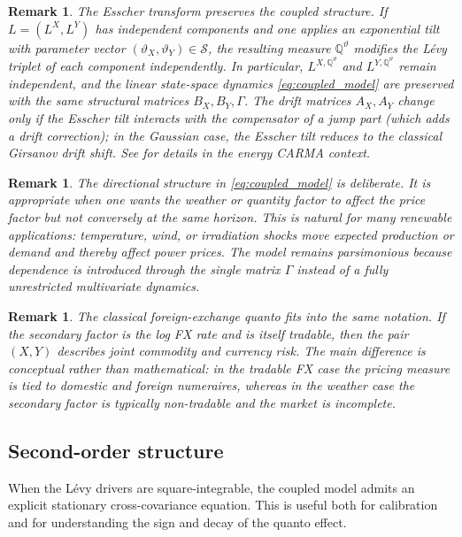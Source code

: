 \documentclass[10pt,a4paper,reqno]{amsart}
\newtheorem{remark}[theorem]{Remark}
\newcommand{\Q}{\mathbb{Q}}
\newcommand{\1}{\mathbbm{1}}
\begin{document}
\begin{remark}\label{rem:esscher_preservation}
The Esscher transform preserves the coupled structure. If \(L = (L^X, L^Y)\)
has independent components and one applies an exponential tilt with parameter
vector \((\vartheta_X, \vartheta_Y) \in \mathcal{S}\), the resulting measure
\(\Q^{\vartheta}\) modifies the Lévy triplet of each component independently.
In particular, \(L^{X,\Q^\vartheta}\) and \(L^{Y,\Q^\vartheta}\) remain
independent, and the linear state-space dynamics \eqref{eq:coupled_model} are
preserved with the same structural matrices \(B_X, B_Y, \Gamma\). The drift
matrices \(A_X, A_Y\) change only if the Esscher tilt interacts with the
compensator of a jump part (which adds a drift correction); in the Gaussian
case, the Esscher tilt reduces to the classical Girsanov drift shift. See
\citet{Ben14} for details in the energy CARMA context.
\end{remark}

\begin{remark}
The directional structure in \eqref{eq:coupled_model} is deliberate. It is
appropriate when one wants the weather or quantity factor to affect the price
factor but not conversely at the same horizon. This is natural for many
renewable applications: temperature, wind, or irradiation shocks move expected
production or demand and thereby affect power prices. The model remains
parsimonious because dependence is introduced through the single matrix
\(\Gamma\) instead of a fully unrestricted multivariate dynamics.
\end{remark}

\begin{remark}
The classical foreign-exchange quanto fits into the same notation. If the
secondary factor is the log FX rate and is itself tradable, then the pair
\((X,Y)\) describes joint commodity and currency risk. The main difference is
conceptual rather than mathematical: in the tradable FX case the pricing measure
is tied to domestic and foreign numeraires, whereas in the weather case the
secondary factor is typically non-tradable and the market is incomplete.
\end{remark}

\subsection{Second-order structure}

When the Lévy drivers are square-integrable, the coupled model admits an
explicit stationary cross-covariance equation. This is useful both for
calibration and for understanding the sign and decay of the quanto effect.
\end{document}
